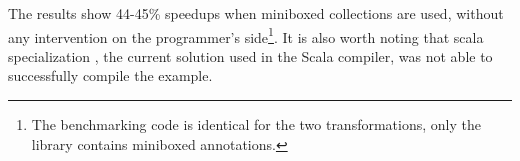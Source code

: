 The results show 44-45\% speedups when miniboxed collections are used, without any intervention on the programmer's side\footnote{The benchmarking code is identical for the two transformations, only the library contains miniboxed annotations.}.
It is also worth noting that scala specialization \cite{iuli-thesis}, the current solution used in the Scala compiler, was not able to successfully compile the example.

